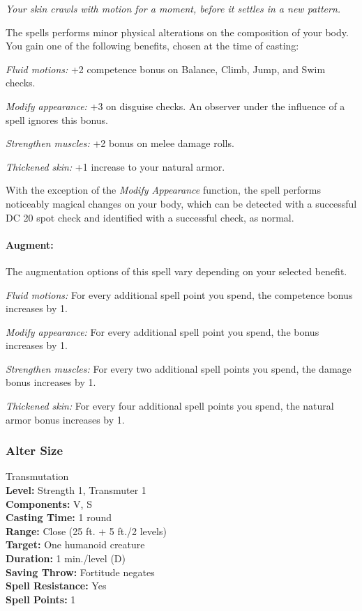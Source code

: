 \emph{Your skin crawls with motion for a moment, before it settles in a new pattern.}

The spells performs minor physical alterations on the composition of your body.
You gain one of the following benefits, chosen at the time of casting:

\begin{list}{}{\leftmargin=1em}  
 \item \emph{Fluid motions:} +2 competence bonus on Balance, Climb, Jump, and Swim checks.
 \item \emph{Modify appearance:} +3 on disguise checks. An observer under the influence of a  spell ignores this bonus.
 \item \emph{Strengthen muscles:} +2 bonus on melee damage rolls.
 \item \emph{Thickened skin:} +1 increase to your natural armor.
\end{list}

With the exception of the \emph{Modify Appearance} function, the spell performs noticeably magical changes on your body, which can be detected with a successful DC 20 spot check and identified with a successful  check, as normal.

\paragraph{Augment:} The augmentation options of this spell vary depending on your selected benefit.  
 \begin{list}{}{\leftmargin=1em}
 \item \emph{Fluid motions:} For every additional spell point you spend, the competence bonus increases by 1.
 \item \emph{Modify appearance:} For every additional spell point you spend, the bonus increases by 1.
 \item \emph{Strengthen muscles:} For every two additional spell points you spend, the damage bonus increases by 1.
 \item \emph{Thickened skin:} For every four additional spell points you spend, the natural armor bonus increases by 1.
\end{list}

\subsubsection{Alter Size}
\label{Spell:AlterSize}
Transmutation
\\ \textbf{Level:} Strength 1, Transmuter 1
\\ \textbf{Components:} V, S
\\ \textbf{Casting Time:} 1 round
\\ \textbf{Range:} Close (25 ft. + 5 ft./2 levels)
\\ \textbf{Target:} One humanoid creature
\\ \textbf{Duration:} 1 min./level (D)
\\ \textbf{Saving Throw:} Fortitude negates
\\ \textbf{Spell Resistance:} Yes
\\ \textbf{Spell Points:} 1

